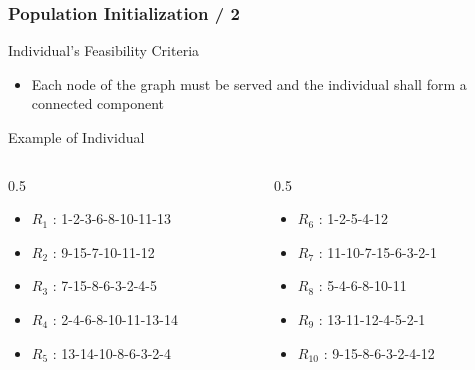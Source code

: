 \documentclass[dvipsnames]{beamer}
\begin{document}
\begin{frame}
  \frametitle{Population Initialization / 2}
  \begin{alertblock}{Individual's Feasibility Criteria}
    \begin{itemize}
      \item Each node of the graph must be served and the individual shall form a connected component
    \end{itemize}
  \end{alertblock}

  \begin{exampleblock}{Example of Individual}
    \label{example:individual}
    \begin{columns}
      \begin{column}{0.5\textwidth}
        \begin{itemize}
          \item  \textbf{$R_{1}$} : 1-2-3-6-8-10-11-13
          \item  \textbf{$R_{2}$} : 9-15-7-10-11-12
          \item  \textbf{$R_{3}$} : 7-15-8-6-3-2-4-5
          \item  \textbf{$R_{4}$} : 2-4-6-8-10-11-13-14
          \item  \textbf{$R_{5}$} : 13-14-10-8-6-3-2-4
        \end{itemize}
      \end{column}
      \begin{column}{0.5\textwidth}
        \begin{itemize}
          \item  \textbf{$R_{6}$} : 1-2-5-4-12
          \item  \textbf{$R_{7}$} : 11-10-7-15-6-3-2-1
          \item  \textbf{$R_{8}$} : 5-4-6-8-10-11
          \item  \textbf{$R_{9}$} : 13-11-12-4-5-2-1
          \item \textbf{$R_{10}$} : 9-15-8-6-3-2-4-12
        \end{itemize}
      \end{column}
    \end{columns}
  \end{exampleblock}
\end{frame}
\end{document}
